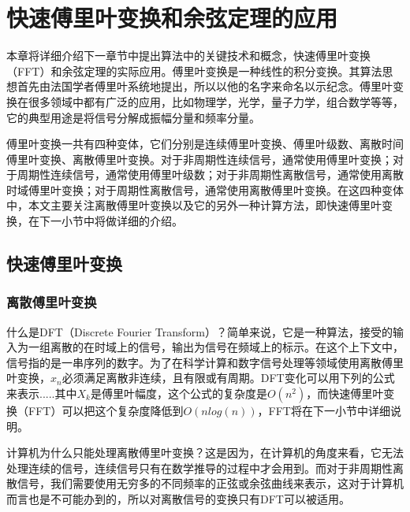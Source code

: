 
\chapter{快速傅里叶变换和余弦定理的应用}
\label{chap:FFTandCos}

本章将详细介绍下一章节中提出算法中的关键技术和概念，快速傅里叶变换（FFT）和余弦定理的实际应用。傅里叶变换是一种线性的积分变换。其算法思想首先由法国学者傅里叶系统地提出，所以以他的名字来命名以示纪念。傅里叶变换在很多领域中都有广泛的应用，比如物理学，光学，量子力学，组合数学等等，它的典型用途是将信号分解成振幅分量和频率分量。

傅里叶变换一共有四种变体，它们分别是连续傅里叶变换、傅里叶级数、离散时间傅里叶变换、离散傅里叶变换。对于非周期性连续信号，通常使用傅里叶变换；对于周期性连续信号，通常使用傅里叶级数；对于非周期性离散信号，通常使用离散时域傅里叶变换；对于周期性离散信号，通常使用离散傅里叶变换。在这四种变体中，本文主要关注离散傅里叶变换以及它的另外一种计算方法，即快速傅里叶变换，在下一小节中将做详细的介绍。

\section{快速傅里叶变换}
\label{sec:FT}

\subsection{离散傅里叶变换}
\label{sec:DFT}
什么是DFT（Discrete Fourier Transform）？简单来说，它是一种算法，接受的输入为一组离散的在时域上的信号，输出为信号在频域上的标示。在这个上下文中，信号指的是一串序列的数字。为了在科学计算和数字信号处理等领域使用离散傅里叶变换，$x_n$必须满足离散非连续，且有限或有周期。DFT变化可以用下列的公式来表示.....其中$X_k$是傅里叶幅度，这个公式的复杂度是$O(n^2)$，而快速傅里叶变换（FFT）可以把这个复杂度降低到$O(nlog(n))$，FFT将在下一小节中详细说明。

计算机为什么只能处理离散傅里叶变换？这是因为，在计算机的角度来看，它无法处理连续的信号，连续信号只有在数学推导的过程中才会用到。而对于非周期性离散信号，我们需要使用无穷多的不同频率的正弦或余弦曲线来表示，这对于计算机而言也是不可能办到的，所以对离散信号的变换只有DFT可以被适用。

